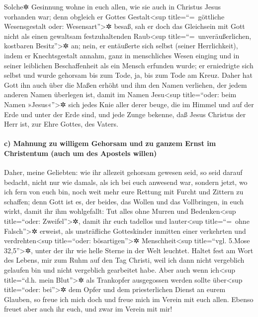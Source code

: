  Solche✲ Gesinnung wohne in euch allen, wie sie auch in
Christus Jesus vorhanden war;  denn obgleich er Gottes
Gestalt\textless sup title=``=~göttliche Wesensgestalt oder:
Wesensart''\textgreater✲ besaß, sah er doch das Gleichsein mit Gott
nicht als einen gewaltsam festzuhaltenden Raub\textless sup
title=``=~unveräußerlichen, kostbaren Besitz''\textgreater✲ an;
 nein, er entäußerte sich selbst (seiner Herrlichkeit),
indem er Knechtsgestalt annahm, ganz in menschliches Wesen einging und
in seiner leiblichen Beschaffenheit als ein Mensch erfunden wurde;
 er erniedrigte sich selbst und wurde gehorsam bis zum
Tode, ja, bis zum Tode am Kreuz.  Daher hat Gott ihn auch
über die Maßen erhöht und ihm den Namen verliehen, der jedem anderen
Namen überlegen ist,  damit im Namen Jesu\textless sup
title=``oder: beim Namen »Jesus«''\textgreater✲ sich jedes Knie aller
derer beuge, die im Himmel und auf der Erde und unter der Erde sind,
 und jede Zunge bekenne, daß Jesus Christus der Herr ist,
zur Ehre Gottes, des Vaters.

\hypertarget{c-mahnung-zu-willigem-gehorsam-und-zu-ganzem-ernst-im-christentum-auch-um-des-apostels-willen}{%
\paragraph{c) Mahnung zu willigem Gehorsam und zu ganzem Ernst im
Christentum (auch um des Apostels
willen)}\label{c-mahnung-zu-willigem-gehorsam-und-zu-ganzem-ernst-im-christentum-auch-um-des-apostels-willen}}

 Daher, meine Geliebten: wie ihr allezeit gehorsam
gewesen seid, so seid darauf bedacht, nicht nur wie damals, als ich bei
euch anwesend war, sondern jetzt, wo ich fern von euch bin, noch weit
mehr eure Rettung mit Furcht und Zittern zu schaffen; 
denn Gott ist es, der beides, das Wollen und das Vollbringen, in euch
wirkt, damit ihr ihm wohlgefallt:  Tut alles ohne Murren
und Bedenken\textless sup title=``oder: Zweifel''\textgreater✲,
 damit ihr euch tadellos und lauter\textless sup
title=``=~ohne Falsch''\textgreater✲ erweist, als unsträfliche
Gotteskinder inmitten einer verkehrten und verdrehten\textless sup
title=``oder: bösartigen''\textgreater✲ Menschheit\textless sup
title=``vgl. 5.Mose 32,5''\textgreater✲, unter der ihr wie helle Sterne
in der Welt leuchtet.  Haltet fest am Wort des Lebens,
mir zum Ruhm auf den Tag Christi, weil ich dann nicht vergeblich
gelaufen bin und nicht vergeblich gearbeitet habe.  Aber
auch wenn ich\textless sup title=``d.h. mein Blut''\textgreater✲ als
Trankopfer ausgegossen werden sollte über\textless sup title=``oder:
bei''\textgreater✲ dem Opfer und dem priesterlichen Dienst an eurem
Glauben, so freue ich mich doch und freue mich im Verein mit euch allen.
 Ebenso freuet aber auch ihr euch, und zwar im Verein mit
mir!

